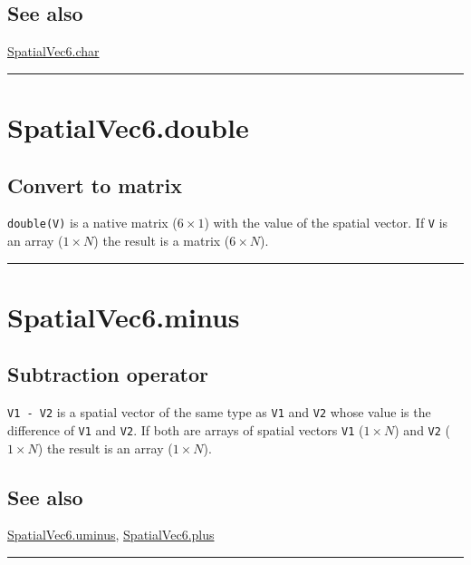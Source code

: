 \subsection*{See also}


\hyperlink{SpatialVec6.char}{\color{blue} SpatialVec6.char}

\vspace{1.5ex}\hrule

\hypertarget{SpatialVec6.double}{\section*{SpatialVec6.double}}
\subsection*{Convert to matrix}


\texttt{double(V)} is a native matrix ($6 \times 1$) with the value of the spatial vector.
If \texttt{V} is an array ($1 \times N$) the result is a matrix ($6 \times N$).

\vspace{1.5ex}\hrule

\hypertarget{SpatialVec6.minus}{\section*{SpatialVec6.minus}}
\subsection*{Subtraction operator}


\texttt{V1 - V2} is a spatial vector of the same type as \texttt{V1} and \texttt{V2} whose value is
the difference of \texttt{V1} and \texttt{V2}.  If both are arrays of spatial vectors \texttt{V1} ($1 \times N$) and
\texttt{V2} ($1 \times N$) the result is an array ($1 \times N$).


\subsection*{See also}


\hyperlink{SpatialVec6.uminus}{\color{blue} SpatialVec6.uminus}, \hyperlink{SpatialVec6.plus}{\color{blue} SpatialVec6.plus}

\vspace{1.5ex}\hrule


